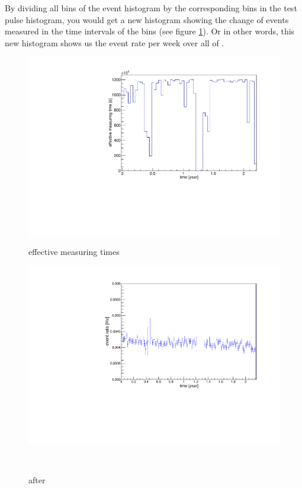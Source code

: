 \documentclass[encoding=utf8,british]{tumphthesis}
\begin{document}
By dividing all bins of the event histogram by the corresponding bins in the test pulse histogram, you would get a new histogram showing the change of events measured in the time intervals of the bins (see figure \ref{fig:ChangeInEventRate}).
Or in other words, this new histogram shows us the event rate per week over all of \PII.
\\
\begin{figure}[t!]
	\centering
	\begin{minipage}{.5\textwidth}
		\centering
		\includegraphics[width=\textwidth]{./Bilder/testpuler.pdf}
		\caption{effective measuring times}
		\label{fig:effectiveMeasuringTimes}
	\end{minipage}%
	\begin{minipage}{.5\textwidth}
		\centering
		\includegraphics[width=\textwidth]{./Bilder/eventRate.pdf}
		\caption{after}
		\label{fig:ChangeInEventRate}
	\end{minipage}
	\\
\end{figure}
\end{document}
